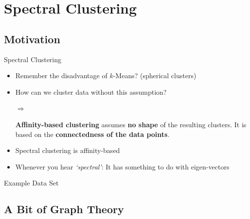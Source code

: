 \section{Spectral Clustering}

\subsection{Motivation}

\begin{frame}{Spectral Clustering}{}
	\begin{itemize}
		\item Remember the disadvantage of $k$-Means? (spherical clusters)
		\item How can we cluster data without this assumption?
		\item[$\bm{\Rightarrow}$] 
		
		\vspace*{3mm}
		\begin{boxBlueNoFrame}
			\textbf{Affinity-based clustering} assumes \textbf{no shape} of the resulting clusters.
			It is based on the \textbf{connectedness of the data points}.
		\end{boxBlueNoFrame}

		\item Spectral clustering is affinity-based
		\item Whenever you hear \textit{`spectral'}: It has something to do with eigen-vectors
	\end{itemize}
\end{frame}


\begin{frame}{Example Data Set}{}
	
\end{frame}


\subsection{A Bit of Graph Theory}

